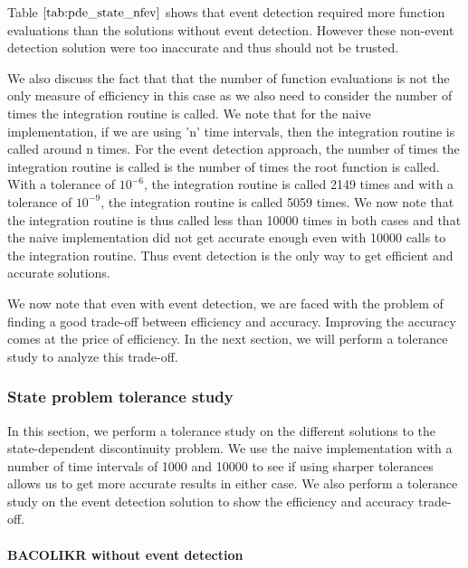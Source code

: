 \documentclass{article}
\begin{document}
Table $\ref{tab:pde_state_nfev}$ shows that event detection required more function evaluations than the solutions without event detection. However these non-event detection solution were too inaccurate and thus should not be trusted. 

We also discuss the fact that that the number of function evaluations is not the only measure of efficiency in this case as we also need to consider the number of times the integration routine is called. We note that for the naive implementation, if we are using 'n' time intervals, then the integration routine is called around n times. For the event detection approach, the number of times the integration routine is called is the number of times the root function is called. With a tolerance of $10^{-6}$, the integration routine is called 2149 times and with a tolerance of $10^{-9}$, the integration routine is called 5059 times. We now note that the integration routine is thus called less than 10000 times in both cases and that the naive implementation did not get accurate enough even with 10000 calls to the integration routine. Thus event detection is the only way to get efficient and accurate solutions.

We now note that even with event detection, we are faced with the problem of finding a good trade-off between efficiency and accuracy. Improving the accuracy comes at the price of efficiency. In the next section, we will perform a tolerance study to analyze this trade-off.

\subsubsection{State problem tolerance study}
\label{subsubsection:pde_state_tol_study}
In this section, we perform a tolerance study on the different solutions to the state-dependent discontinuity problem. We use the naive implementation with a number of time intervals of 1000 and 10000 to see if using sharper tolerances allows us to get more accurate results in either case. We also perform a tolerance study on the event detection solution to show the efficiency and accuracy trade-off.

\paragraph{BACOLIKR without event detection}
\end{document}
